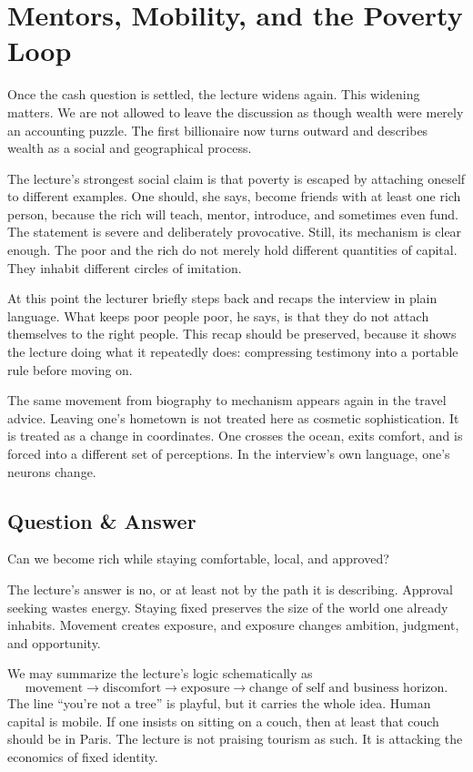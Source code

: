 \section{Mentors, Mobility, and the Poverty Loop}

Once the cash question is settled, the lecture widens again. This widening matters. We are not allowed to leave the discussion as though wealth were merely an accounting puzzle. The first billionaire now turns outward and describes wealth as a social and geographical process.

The lecture's strongest social claim is that poverty is escaped by attaching oneself to different examples. One should, she says, become friends with at least one rich person, because the rich will teach, mentor, introduce, and sometimes even fund. The statement is severe and deliberately provocative. Still, its mechanism is clear enough. The poor and the rich do not merely hold different quantities of capital. They inhabit different circles of imitation.

At this point the lecturer briefly steps back and recaps the interview in plain language. What keeps poor people poor, he says, is that they do not attach themselves to the right people. This recap should be preserved, because it shows the lecture doing what it repeatedly does: compressing testimony into a portable rule before moving on.

The same movement from biography to mechanism appears again in the travel advice. Leaving one's hometown is not treated here as cosmetic sophistication. It is treated as a change in coordinates. One crosses the ocean, exits comfort, and is forced into a different set of perceptions. In the interview's own language, one's neurons change.

\subsection{Question \& Answer}

Can we become rich while staying comfortable, local, and approved?

The lecture's answer is no, or at least not by the path it is describing. Approval seeking wastes energy. Staying fixed preserves the size of the world one already inhabits. Movement creates exposure, and exposure changes ambition, judgment, and opportunity.

We may summarize the lecture's logic schematically as
\begin{equation}
\text{movement} \to \text{discomfort} \to \text{exposure} \to \text{change of self and business horizon}.
\end{equation}
The line ``you're not a tree'' is playful, but it carries the whole idea. Human capital is mobile. If one insists on sitting on a couch, then at least that couch should be in Paris. The lecture is not praising tourism as such. It is attacking the economics of fixed identity.

